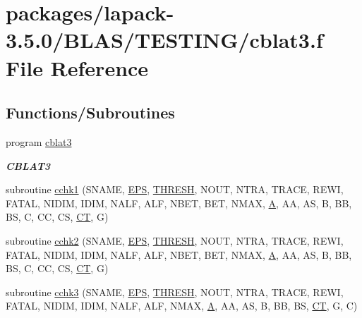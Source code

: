 \hypertarget{cblat3_8f}{}\section{packages/lapack-\/3.5.0/\+B\+L\+A\+S/\+T\+E\+S\+T\+I\+N\+G/cblat3.f File Reference}
\label{cblat3_8f}
\subsection*{Functions/\+Subroutines}
\begin{DoxyCompactItemize}
\item 
program \hyperlink{group__complex__blas__testing_ga5e787fb59b00025ed8b1c227d3880c8b}{cblat3}
\begin{DoxyCompactList}\small\item\em {\bfseries C\+B\+L\+A\+T3} \end{DoxyCompactList}\item 
subroutine \hyperlink{cblat3_8f_a52907ff33fb088c024ba261d94c890d6}{cchk1} (S\+N\+A\+M\+E, \hyperlink{tukey_8c_a6ebf6899d6c1c8b7b9d09be872c05aae}{E\+P\+S}, \hyperlink{zlaqgs_8c_a0656018abfc9fa2821827415f5d5ea57}{T\+H\+R\+E\+S\+H}, N\+O\+U\+T, N\+T\+R\+A, T\+R\+A\+C\+E, R\+E\+W\+I, F\+A\+T\+A\+L, N\+I\+D\+I\+M, I\+D\+I\+M, N\+A\+L\+F, A\+L\+F, N\+B\+E\+T, B\+E\+T, N\+M\+A\+X, \hyperlink{classA}{A}, A\+A, A\+S, B, B\+B, B\+S, C, C\+C, C\+S, \hyperlink{tau_8h_ae9ab3801c1afb4f20cfd669d76aec283}{C\+T}, G)
\item 
subroutine \hyperlink{cblat3_8f_addd6c08f9bfe07296e8cce8d393ccbe2}{cchk2} (S\+N\+A\+M\+E, \hyperlink{tukey_8c_a6ebf6899d6c1c8b7b9d09be872c05aae}{E\+P\+S}, \hyperlink{zlaqgs_8c_a0656018abfc9fa2821827415f5d5ea57}{T\+H\+R\+E\+S\+H}, N\+O\+U\+T, N\+T\+R\+A, T\+R\+A\+C\+E, R\+E\+W\+I, F\+A\+T\+A\+L, N\+I\+D\+I\+M, I\+D\+I\+M, N\+A\+L\+F, A\+L\+F, N\+B\+E\+T, B\+E\+T, N\+M\+A\+X, \hyperlink{classA}{A}, A\+A, A\+S, B, B\+B, B\+S, C, C\+C, C\+S, \hyperlink{tau_8h_ae9ab3801c1afb4f20cfd669d76aec283}{C\+T}, G)
\item 
subroutine \hyperlink{cblat3_8f_afa4368523ad7b9b3ca526127d431675e}{cchk3} (S\+N\+A\+M\+E, \hyperlink{tukey_8c_a6ebf6899d6c1c8b7b9d09be872c05aae}{E\+P\+S}, \hyperlink{zlaqgs_8c_a0656018abfc9fa2821827415f5d5ea57}{T\+H\+R\+E\+S\+H}, N\+O\+U\+T, N\+T\+R\+A, T\+R\+A\+C\+E, R\+E\+W\+I, F\+A\+T\+A\+L, N\+I\+D\+I\+M, I\+D\+I\+M, N\+A\+L\+F, A\+L\+F, N\+M\+A\+X, \hyperlink{classA}{A}, A\+A, A\+S, B, B\+B, B\+S, \hyperlink{tau_8h_ae9ab3801c1afb4f20cfd669d76aec283}{C\+T}, G, C)

\end{DoxyCompactItemize}

